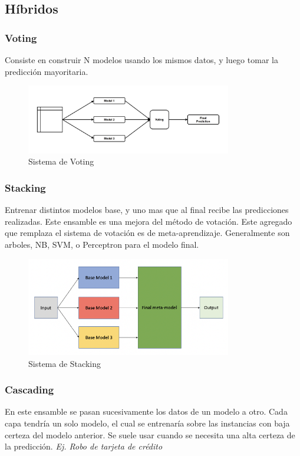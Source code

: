 \documentclass[titlepage,a4paper]{article}
\begin{document}
\subsection{Híbridos}
\subsubsection{Voting}
Consiste en construir N modelos usando los mismos datos, y luego tomar la predicción mayoritaria.

\begin{figure}[!htb]
    \centering
    \includegraphics[width=0.8\textwidth]{imagenesResumen/Voting.png}
    \caption{Sistema de Voting}
\end{figure}

\subsubsection{Stacking}
Entrenar distintos modelos base, y uno mas que al final recibe las predicciones realizadas. Este ensamble es una mejora del método de votación. Este agregado que remplaza el sistema de votación es de meta-aprendizaje. Generalmente son arboles, NB, SVM, o Perceptron para el modelo final.

\begin{figure}[!htb]
    \centering
    \includegraphics[width=0.8\textwidth]{imagenesResumen/Stacking.png}
    \caption{Sistema de Stacking}
\end{figure}

\subsubsection{Cascading}
En este ensamble se pasan sucesivamente los datos de un modelo a otro. Cada capa tendría un solo modelo, el cual se entrenaría sobre las instancias con baja certeza del modelo anterior. Se suele usar cuando se necesita una alta certeza de la predicción. \textit{Ej. Robo de tarjeta de crédito}
\end{document}
